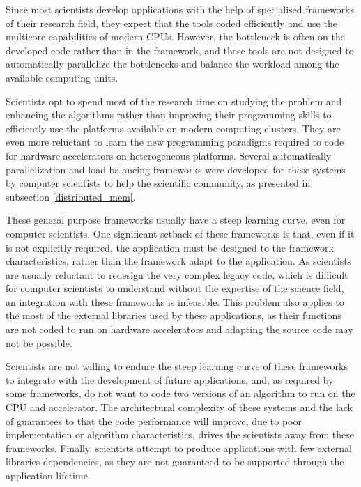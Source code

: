 Since most scientists develop applications with the help of specialised frameworks of their research field, they expect that the tools coded efficiently and use the multicore capabilities of modern CPUs. However, the bottleneck is often on the developed code rather than in the framework, and these tools are not designed to automatically parallelize the bottlenecks and balance the workload among the available computing units.

Scientists opt to spend most of the research time on studying the problem and enhancing the algorithms rather than improving their programming skills to efficiently use the platforms available on modern computing clusters. They are even more reluctant to learn the new programming paradigms required to code for hardware accelerators on heterogeneous platforms. Several automatically parallelization and load balancing frameworks were developed for these systems by computer scientists to help the scientific community, as presented in subsection \ref{distributed_mem}.

These general purpose frameworks usually have a steep learning curve, even for computer scientists. One significant setback of these frameworks is that, even if it is not explicitly required, the application must be designed to the framework characteristics, rather than the framework adapt to the application. As scientists are usually reluctant to redesign the very complex legacy code, which is difficult for computer scientists to understand without the expertise of the science field, an integration with these frameworks is infeasible. This problem also applies to the most of the external libraries used by these applications, as their functions are not coded to run on hardware accelerators and adapting the source code may not be possible.

Scientists are not willing to endure the steep learning curve of these frameworks to integrate with the development of future applications, and, as required by some frameworks, do not want to code two versions of an algorithm to run on the CPU and accelerator. The architectural complexity of these systems and the lack of guarantees to that the code performance will improve, due to poor implementation or algorithm characteristics, drives the scientists away from these frameworks. Finally, scientists attempt to produce applications with few external libraries dependencies, as they are not guaranteed to be supported through the application lifetime.

